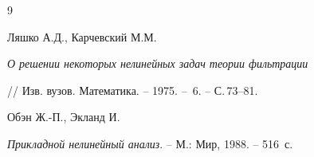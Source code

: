 \begin{thebibliography} {9}


Ляшко А.Д., Карчевский М.М.


{\em О решении некоторых нелинейных задач теории фильтрации}


// Изв. вузов. Математика. -- 1975. -- \No\,6. -- С.\,73--81.







Обэн Ж.-П., Экланд И.


{\em Прикладной нелинейный анализ}. --  М.: Мир, 1988. --  516~с.





\end{thebibliography}





\vskip 2cm












\label{end}





